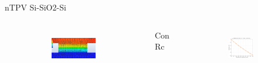 \documentclass[spanish,a4paper]{beamer}%
\begin{document}
\begin{frame}{nTPV Si-SiO2-Si}
{\begin{columns}
\begin{figure}
							\begin{subfigure}[b]{0.82\columnwidth}
									\includegraphics[width=\textwidth]{SiSiO2Si_1000nm_Plane2}%
							\end{subfigure}
							\label{fig:SiSiO2Si_cond}%
					\end{figure}
			\vspace{-10pt}
					\begin{block}{\centering Con Rc}
					\end{block}
			\vspace{-10pt}
			\begin{figure}%
			\centering
			\begin{subfigure}[b]{0.9\columnwidth}
				\includegraphics[width=\textwidth]{Prc2_SiSiO2Si}%
			\end{subfigure}
				\hfill \vfill
			\begin{subfigure}[b]{0.8\columnwidth}

\end{subfigure}
\end{figure}
\end{columns}}
\end{frame}
\end{document}
